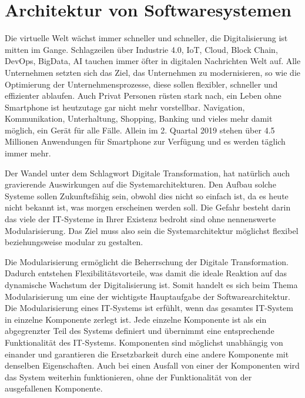 \section{Architektur von Softwaresystemen}
\label{sec:softwarearchitektur}


Die virtuelle Welt wächst immer schneller und schneller, die Digitalisierung ist mitten im Gange. Schlagzeilen über Industrie 4.0, IoT, Cloud, Block Chain, DevOps, BigData, AI tauchen immer öfter in digitalen Nachrichten Welt auf. Alle Unternehmen setzten sich das Ziel, das Unternehmen zu modernisieren, so wie die Optimierung der Unternehmensprozesse, diese sollen flexibler, schneller und effizienter ablaufen. Auch Privat Personen rüsten stark nach, ein Leben ohne Smartphone ist heutzutage gar nicht mehr vorstellbar. Navigation, Kommunikation, Unterhaltung, Shopping, Banking und vieles mehr damit möglich, ein Gerät für alle Fälle. Allein im 2. Quartal 2019 stehen über 4.5 Millionen Anwendungen für Smartphone zur Verfügung und es werden täglich immer mehr.

Der Wandel unter dem Schlagwort \grqq{}Digitale Transformation\grqq{}, hat natürlich auch gravierende Auswirkungen auf die Systemarchitekturen. Den Aufbau solche Systeme sollen Zukunftsfähig sein, obwohl dies nicht so einfach ist, da es heute nicht bekannt ist, was morgen erscheinen werden soll. Die Gefahr besteht darin das viele der IT-Systeme in Ihrer Existenz bedroht sind ohne nennenswerte Modularisierung. Das Ziel muss also sein die Systemarchitektur möglichst flexibel beziehungsweise modular zu gestalten.\\

Die Modularisierung ermöglicht die Beherrschung der \grqq{}Digitale Transformation\grqq{}. Dadurch entstehen Flexibilitätsvorteile, was damit die ideale Reaktion auf das dynamische Wachstum der Digitalisierung ist. Somit handelt es sich beim Thema Modularisierung um eine der wichtigste Hauptaufgabe der Softwarearchitektur. Die Modularisierung eines IT-Systems ist erfühlt, wenn das gesamtes IT-System in einzelne Komponente zerlegt ist. Jede einzelne Komponente ist als ein abgegrenzter Teil des Systems definiert und übernimmt eine entsprechende Funktionalität des IT-Systems. Komponenten sind möglichst unabhängig von einander und garantieren die Ersetzbarkeit durch eine andere Komponente mit denselben Eigenschaften. Auch bei einen Ausfall von einer der Komponenten wird das System weiterhin funktionieren, ohne der Funktionalität von der ausgefallenen Komponente.

